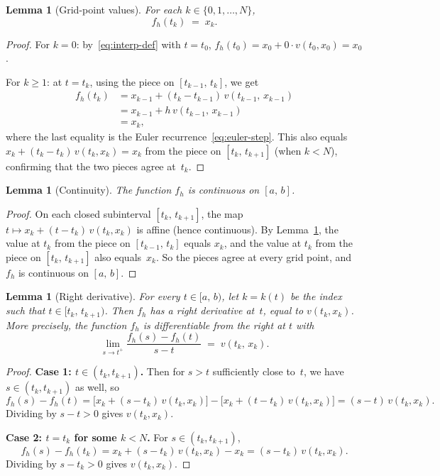 \documentclass[11pt,a4paper]{article}
\newtheorem{lemma}[theorem]{Lemma}
\theoremstyle{definition}
\newcommand{\Icc}[2]{[#1,\, #2]}
\newcommand{\Ico}[2]{[#1,\, #2)}
\begin{document}
\begin{lemma}[Grid-point values]\label{lem:grid-values}
For each $k \in \{0, 1, \ldots, N\}$,
\[
  f_h(t_k) \;=\; x_k.
\]
\end{lemma}

\begin{proof}
For $k = 0$: by~\eqref{eq:interp-def} with $t = t_0$,
$f_h(t_0) = x_0 + 0 \cdot v(t_0, x_0) = x_0$.

For $k \ge 1$: at $t = t_k$, using the piece on
$\Icc{t_{k-1}}{t_k}$, we get
\begin{align*}
  f_h(t_k)
  &= x_{k-1} + (t_k - t_{k-1})\,v(t_{k-1},\, x_{k-1}) \\
  &= x_{k-1} + h\,v(t_{k-1},\, x_{k-1}) \\
  &= x_k,
\end{align*}
where the last equality is the Euler recurrence~\eqref{eq:euler-step}.
This also equals $x_k + (t_k - t_k)\,v(t_k, x_k) = x_k$
from the piece on $\Icc{t_k}{t_{k+1}}$ (when $k < N$),
confirming that the two pieces agree at~$t_k$.
\end{proof}


\begin{lemma}[Continuity]\label{lem:continuity}
The function $f_h$ is continuous on $\Icc{a}{b}$.
\end{lemma}

\begin{proof}
On each closed subinterval $\Icc{t_k}{t_{k+1}}$, the map
$t \mapsto x_k + (t - t_k)\,v(t_k, x_k)$ is affine (hence
continuous). By Lemma~\ref{lem:grid-values}, the value at
$t_k$ from the piece on $\Icc{t_{k-1}}{t_k}$ equals $x_k$,
and the value at $t_k$ from the piece on $\Icc{t_k}{t_{k+1}}$
also equals~$x_k$. So the pieces agree at every grid point, and
$f_h$ is continuous on $\Icc{a}{b}$.
\end{proof}


\begin{lemma}[Right derivative]\label{lem:right-deriv}
For every $t \in \Ico{a}{b}$, let $k = k(t)$ be the index such
that $t \in \Ico{t_k}{t_{k+1}}$. Then $f_h$ has a right derivative
at~$t$, equal to $v(t_k, x_k)$. More precisely, the function $f_h$
is differentiable from the right at $t$ with
\begin{equation}\label{eq:right-deriv}
  \lim_{s \to t^+} \frac{f_h(s) - f_h(t)}{s - t}
  \;=\; v(t_k,\, x_k).
\end{equation}
\end{lemma}

\begin{proof}
\textbf{Case 1: $t \in (t_k, t_{k+1})$.}
Then for $s > t$ sufficiently close to~$t$, we have
$s \in (t_k, t_{k+1})$ as well, so
\[
  f_h(s) - f_h(t) = \bigl[x_k + (s - t_k)\,v(t_k, x_k)\bigr]
                   - \bigl[x_k + (t - t_k)\,v(t_k, x_k)\bigr]
                   = (s - t)\,v(t_k, x_k).
\]
Dividing by $s - t > 0$ gives $v(t_k, x_k)$.

\textbf{Case 2: $t = t_k$ for some $k < N$.}
For $s \in (t_k, t_{k+1})$,
\[
  f_h(s) - f_h(t_k)
  = x_k + (s - t_k)\,v(t_k, x_k) - x_k
  = (s - t_k)\,v(t_k, x_k).
\]
Dividing by $s - t_k > 0$ gives $v(t_k, x_k)$.
\end{proof}
\end{document}
